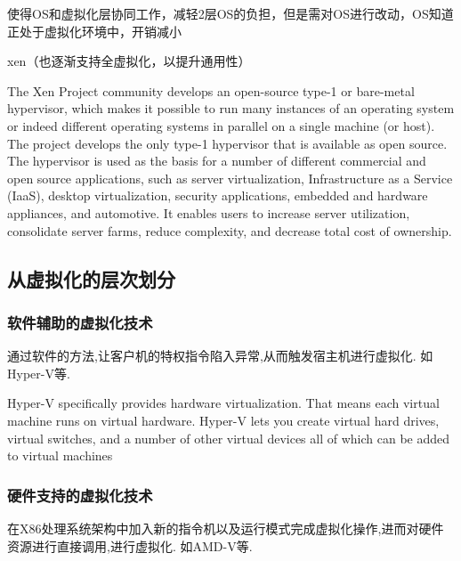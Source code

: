 使得OS和虚拟化层协同工作，减轻2层OS的负担，但是需对OS进行改动，OS知道正处于虚拟化环境中，开销减小

xen（也逐渐支持全虚拟化，以提升通用性）

\begin{definition}[Xen]
    The Xen Project community develops an open-source type-1 or bare-metal hypervisor, which makes it possible to run many instances of an operating system or indeed different operating systems in parallel on a single machine (or host). The project develops the only type-1 hypervisor that is available as open source. The hypervisor is used as the basis for a number of different commercial and open source applications, such as server virtualization, Infrastructure as a Service (IaaS), desktop virtualization, security applications, embedded and hardware appliances, and automotive. It enables users to increase server utilization, consolidate server farms, reduce complexity, and decrease total cost of ownership.
\end{definition}

\subsection{从虚拟化的层次划分}

\subsubsection{软件辅助的虚拟化技术}

\begin{definition}[软件辅助的虚拟化技术]
    通过软件的方法,让客户机的特权指令陷入异常,从而触发宿主机进行虚拟化. 如Hyper-V等. 
\end{definition}

\begin{definition}[Hyper-V]
    Hyper-V specifically provides hardware virtualization. That means each virtual machine runs on virtual hardware. Hyper-V lets you create virtual hard drives, virtual switches, and a number of other virtual devices all of which can be added to virtual machines
\end{definition}

\subsubsection{硬件支持的虚拟化技术}

\begin{definition}[硬件支持的虚拟化技术]
    在X86处理系统架构中加入新的指令机以及运行模式完成虚拟化操作,进而对硬件资源进行直接调用,进行虚拟化. 如AMD-V等. 
\end{definition}

